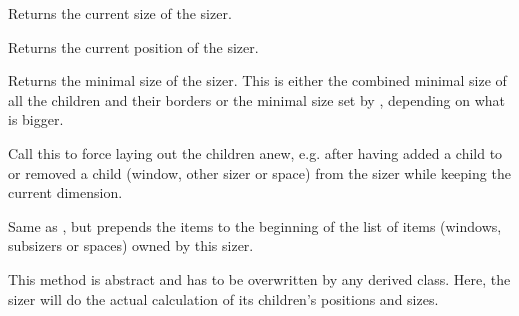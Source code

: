Returns the current size of the sizer.

\label{wxsizergetposition}


Returns the current position of the sizer.

\label{wxsizergetminsize}


Returns the minimal size of the sizer. This is either the combined minimal
size of all the children and their borders or the minimal size set by
, depending on what is bigger.

\label{wxsizerlayout}


Call this to force laying out the children anew, e.g. after having added a child
to or removed a child (window, other sizer or space) from the sizer while keeping
the current dimension.

\label{wxsizerprepend}




Same as , but prepends the items to the beginning of the
list of items (windows, subsizers or spaces) owned by this sizer.

\label{wxsizerrecalcsizes}


This method is abstract and has to be overwritten by any derived class.
Here, the sizer will do the actual calculation of its children's positions
and sizes.

\label{wxsizerremove}


